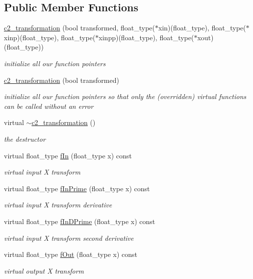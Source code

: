 \subsection*{Public Member Functions}
\begin{DoxyCompactItemize}
\item 
\hyperlink{classc2__transformation_a2b8606275a019b3a64612ecb28272999}{c2\+\_\+transformation} (bool transformed, float\+\_\+type($\ast$xin)(float\+\_\+type), float\+\_\+type($\ast$xinp)(float\+\_\+type), float\+\_\+type($\ast$xinpp)(float\+\_\+type), float\+\_\+type($\ast$xout)(float\+\_\+type))
\begin{DoxyCompactList}\small\item\em initialize all our function pointers \end{DoxyCompactList}\item 
\hyperlink{classc2__transformation_a1cba0d84b0c713e189eb6cf2c08ef1d2}{c2\+\_\+transformation} (bool transformed)
\begin{DoxyCompactList}\small\item\em initialize all our function pointers so that only the (overridden) virtual functions can be called without an error \end{DoxyCompactList}\item 
virtual \hyperlink{classc2__transformation_ad0f684d47ebb7fdc089b7d298cf60120}{$\sim$c2\+\_\+transformation} ()
\begin{DoxyCompactList}\small\item\em the destructor \end{DoxyCompactList}\item 
virtual float\+\_\+type \hyperlink{classc2__transformation_a30b16abc3cdbcde5a0dacac94794d34f}{f\+In} (float\+\_\+type x) const 
\begin{DoxyCompactList}\small\item\em virtual input X transform \end{DoxyCompactList}\item 
virtual float\+\_\+type \hyperlink{classc2__transformation_a6b3b1aa9a73981b93b9fd9dbabe2fcb1}{f\+In\+Prime} (float\+\_\+type x) const 
\begin{DoxyCompactList}\small\item\em virtual input X transform derivative \end{DoxyCompactList}\item 
virtual float\+\_\+type \hyperlink{classc2__transformation_a54a2e8100a32c033ceb40b3ef0783b28}{f\+In\+D\+Prime} (float\+\_\+type x) const 
\begin{DoxyCompactList}\small\item\em virtual input X transform second derivative \end{DoxyCompactList}\item 
virtual float\+\_\+type \hyperlink{classc2__transformation_a5f0763a91e99b1abc5bd227a2cf19ceb}{f\+Out} (float\+\_\+type x) const 
\begin{DoxyCompactList}\small\item\em virtual output X transform \end{DoxyCompactList}\end{DoxyCompactItemize}
